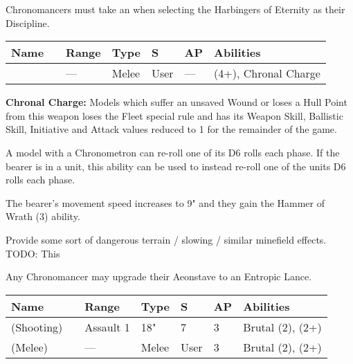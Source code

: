 
Chronomancers must take an  when selecting the Harbingers of Eternity as their Discipline.

\label{Aeonstave}
\noindent
\begin{tabular}{||m{130pt} m{10pt} m{31pt} m{55pt} m{12pt} m{12pt} m{210pt}||}
	\hline
	Name & & Range & Type & S & AP & Abilities \\
	\hline
	\quickref{Aeonstave} & & — & Melee & User & — & \quickref{Entropic Strike} (4+), Chronal Charge \\
	\hline
\end{tabular}
\textbf{Chronal Charge:} Models which suffer an unsaved Wound or loses a Hull Point from this weapon loses the Fleet special rule and has its Weapon Skill, Ballistic Skill, Initiative and Attack values reduced to 1 for the remainder of the game.


A model with a Chronometron can re-roll one of its D6 rolls each phase. If the bearer is in a unit, this ability can be used to instead re-roll one of the units D6 rolls each phase.


The bearer's movement speed increases to 9" and they gain the Hammer of Wrath (3) ability.


Provide some sort of dangerous terrain / slowing / similar minefield effects. TODO: This

 \label{Entropic Lance}

Any Chronomancer may upgrade their Aeonstave to an Entropic Lance.

\noindent
\begin{tabular}{||m{130pt} m{10pt} m{31pt} m{55pt} m{12pt} m{12pt} m{210pt}||}
	\hline
	Name & & Range & Type & S & AP & Abilities \\
	\hline
	\quickref{Entropic Lance} (Shooting) & & Assault 1 & 18" & 7 & 3 & Brutal (2), \quickref{Entropic Strike} (2+) \\
	\quickref{Entropic Lance} (Melee) & & — & Melee & User & 3 & Brutal (2), \quickref{Entropic Strike} (2+) \\
	\hline
\end{tabular}

